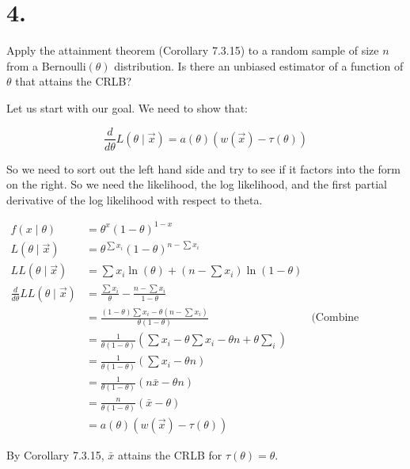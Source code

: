 \section*{4.}

Apply the attainment theorem (Corollary 7.3.15) to a random sample of size $n$ from a Bernoulli$(\theta)$ distribution. Is there an unbiased estimator of a function of $\theta$ that attains the CRLB?

Let us start with our goal. We need to show that:

\[
	\frac{d}{d\theta} L(\theta \mid \vec{x}) = a(\theta) \left( w(\vec{x}) - \tau(\theta) \right)
\]

So we need to sort out the left hand side and try to see if it factors into the form on the right. So we need the likelihood, the log likelihood, and the first partial derivative of the log likelihood with respect to theta.

\begin{align*}
	f(x \mid \theta) &= \theta^x(1-\theta)^{1-x} \\
	L(\theta \mid \vec{x}) &= \theta^{\sum x_i} (1-\theta)^{n - \sum x_i} \\
	LL(\theta \mid \vec{x}) &= \sum x_i \ln(\theta) + (n-\sum x_i)\ln(1-\theta) \\
	\frac{d}{d\theta} LL(\theta \mid \vec{x}) &= \frac{\sum x_i}{\theta} - \frac{n - \sum x_i}{1-\theta} \\
	&= \frac{(1 - \theta) \sum x_i - \theta(n - \sum x_i)}{\theta(1-\theta)} & \text{(Combine fractions)} \\
	&= \frac{1}{\theta(1-\theta)}\left( \sum x_i - \theta \sum x_i - \theta n + \theta \sum_i \right)  \\
	&= \frac{1}{\theta(1-\theta)}\left( \sum x_i - \theta n \right) \\
	&= \frac{1}{\theta(1-\theta)}\left( n\bar{x} - \theta n \right) \\
	&= \frac{n}{\theta(1-\theta)}\left( \bar{x} - \theta \right) \\
	&= a(\theta)\left( w(\vec{x}) - \tau(\theta) \right)
\end{align*}

By Corollary 7.3.15, $\bar{x}$ attains the CRLB for $\tau(\theta) = \theta$.

